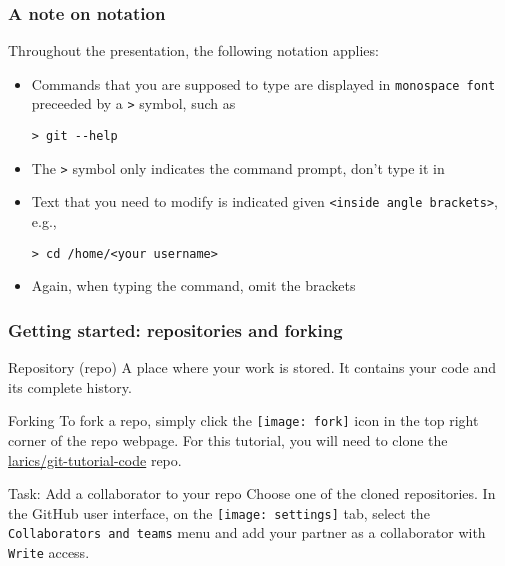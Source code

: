
\begin{frame}[fragile]

\frametitle{A note on notation}
	
Throughout the presentation, the following notation applies:

\begin{itemize}
	\item Commands that you are supposed to type are displayed in \texttt{monospace font} preceeded by a \texttt{>} symbol, such as
	\begin{verbatim}
> git --help
	\end{verbatim}
	\item The \texttt{>} symbol only indicates the command prompt, don't type it in
	\item Text that you need to modify is indicated given \texttt{<inside angle brackets>}, e.g.,
	\begin{verbatim}
> cd /home/<your username>
	\end{verbatim}
	\item Again, when typing the command, omit the brackets
\end{itemize}

\end{frame}


\begin{frame}[fragile]

\frametitle{Getting started: repositories and forking}

\begin{block}{Repository (repo)}
	A place where your work is stored. It contains your code and its complete history. 
\end{block}

\begin{block}{Forking}
	To fork a repo, simply click the \texttt{[image: fork]} icon in the top right corner of the repo webpage. For this tutorial, you will need to clone the \href{https://github.com/larics/git-tutorial-code.git}{larics/git-tutorial-code} repo.
\end{block}

\begin{block}{Task: Add a collaborator to your repo}
Choose one of the cloned repositories. In the GitHub user interface, on the \texttt{[image: settings]} tab, select the \texttt{Collaborators and teams} menu and add your partner as a collaborator with \texttt{Write} access.
\end{block}

\end{frame}
	
